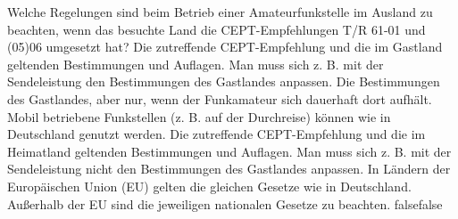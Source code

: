     {Welche Regelungen sind beim Betrieb einer Amateurfunkstelle im Ausland zu beachten, wenn das besuchte Land die CEPT-Empfehlungen T/R 61-01 und (05)06 umgesetzt hat?}
    {Die zutreffende CEPT-Empfehlung und die im Gastland geltenden Bestimmungen und Auflagen. Man muss sich z. B. mit der Sendeleistung den Bestimmungen des Gastlandes anpassen.}
    {Die Bestimmungen des Gastlandes, aber nur, wenn der Funkamateur sich dauerhaft dort aufhält. Mobil betriebene Funkstellen (z. B. auf der Durchreise) können wie in Deutschland genutzt werden.}
    {Die zutreffende CEPT-Empfehlung und die im Heimatland geltenden Bestimmungen und Auflagen. Man muss sich z. B. mit der Sendeleistung nicht den Bestimmungen des Gastlandes anpassen.}
    {In Ländern der Europäischen Union (EU) gelten die gleichen Gesetze wie in Deutschland. Außerhalb der EU sind die jeweiligen nationalen Gesetze zu beachten.}
    {false}{false}